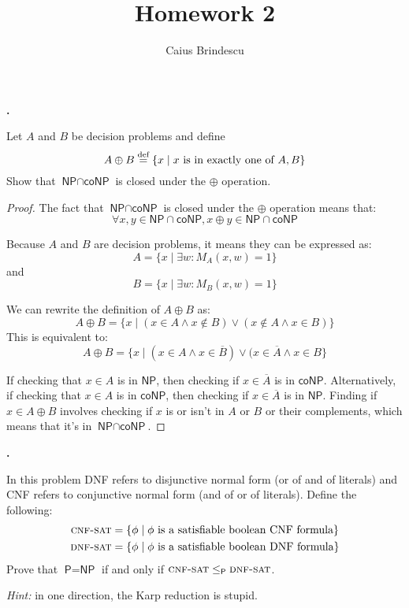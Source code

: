 \documentclass[letterpaper,11pt]{article}
\title{Homework 2}
\author{Caius Brindescu}
\newcommand{\cc}[1]{\ensuremath{\textsf{#1}}\xspace}
\renewcommand{\P}{\cc{P}}
\newcommand{\NP}{\cc{NP}}
\newcommand{\coNP}{\cc{coNP}}
\newcommand{\karp}{\le_{\textsf{P}}}
\newcounter{problem}
\newenvironment{problem}%
{%
	\stepcounter{problem}%
	\textbf{\theproblem.}
	\large
}{\\}%
\begin{document}
\maketitle

\begin{problem}
%
Let $A$ and $B$ be decision problems and define
\[
    A \oplus B \overset{\scriptsize\textrm{def}}= 
    \{ x \mid x \mbox{ is in exactly one of } A, B \}
\]
Show that $\NP \cap \coNP$ is closed under the $\oplus$ operation.
\end{problem}

\begin{proof}
The fact that $\NP \cap \coNP$ is closed under the $\oplus$ operation means that:
\[
	\forall x, y \in \NP \cap \coNP, x \oplus y \in \NP \cap \coNP
\]

Because $A$ and $B$ are decision problems, it means they can be expressed as:
\[
	A=\{x \mid \exists w : M_{A}(x,w) = 1\}
\]
and
\[
	B=\{x \mid \exists w : M_{B}(x,w) = 1\}
\]

We can rewrite the definition of $A \oplus B$ as:
\[
	A \oplus B = \{ x \mid ( x \in A \wedge x \notin B) \vee (x \notin A \wedge x \in B) \}
\]
%
This is equivalent to:
\[
	A \oplus B = \{ x \mid ( x \in A \wedge x \in \overline{B}) \vee (x \in \overline{A} \wedge x \in B \}
\]

If checking that $x \in A$ is in $\NP$, then checking if $x \in \overline{A}$ is in $\coNP$.
Alternatively, if checking that $x \in A$ is in $\coNP$, then checking if $x \in \overline{A}$ is in $\NP$.
Finding if $x \in A \oplus B$ involves checking if $x$ is or isn't in $A$ or $B$ or their complements, which means that it's in $\NP \cap \coNP$.

\end{proof}

\begin{problem}
In this problem DNF refers to disjunctive normal form ({\sc or} of {\sc and} of literals) and CNF refers to conjunctive normal form ({\sc and} of {\sc or} of literals). Define the following:
\begin{align*}
    \textsc{cnf-sat} &= \{ \phi \mid \phi \mbox{ is a satisfiable boolean CNF formula}\} \\
    \textsc{dnf-sat} &= \{ \phi \mid \phi \mbox{ is a satisfiable boolean DNF formula}\} 
\end{align*}
Prove that $\P = \NP$ if and only if $\textsc{cnf-sat} \karp \textsc{dnf-sat}$.

{\em Hint:} in one direction, the Karp reduction is stupid.
\end{problem}
\end{document}
